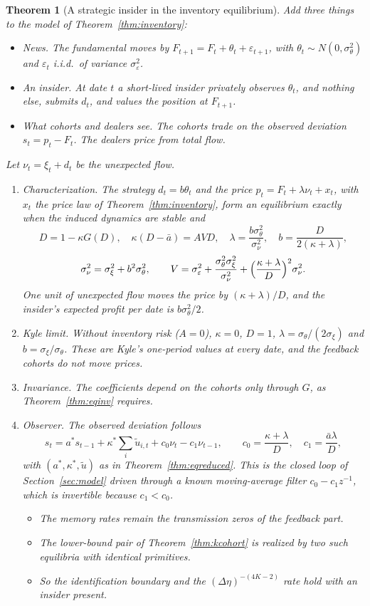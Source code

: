 \documentclass[12pt]{article}
\newtheorem{theorem}{Theorem}[section]
\theoremstyle{definition}
\theoremstyle{remark}
\begin{document}
\begin{theorem}[A strategic insider in the inventory equilibrium]\label{thm:insider}
Add three things to the model of Theorem~\ref{thm:inventory}:
\begin{itemize}[itemsep=1pt,topsep=2pt]
\item \emph{News.} The fundamental moves by $F_{t+1}=F_t+\theta_t+\varepsilon_{t+1}$, with $\theta_t\sim N(0,\sigma_\theta^2)$ and $\varepsilon_t$ i.i.d.\ of variance $\sigma_\varepsilon^2$.
\item \emph{An insider.} At date $t$ a short-lived insider privately observes $\theta_t$, and nothing else, submits $d_t$, and values the position at $F_{t+1}$.
\item \emph{What cohorts and dealers see.} The cohorts trade on the observed deviation $s_t=p_t-F_t$. The dealers price from total flow.
\end{itemize}
Let $\nu_t=\xi_t+d_t$ be the unexpected flow.
\begin{enumerate}[label=(\roman*),itemsep=1pt]
\item \emph{Characterization.} The strategy $d_t=b\theta_t$ and the price $p_t=F_t+\lambda\nu_t+x_t$, with $x_t$ the price law of Theorem~\ref{thm:inventory}, form an equilibrium exactly when the induced dynamics are stable and
\[
 D=1-\kappa G(D),\quad \kappa(D-\bar a)=AVD,\quad \lambda=\frac{b\sigma_\theta^2}{\sigma_\nu^2},\quad b=\frac{D}{2(\kappa+\lambda)},
\]
\[
 \sigma_\nu^2=\sigma_\xi^2+b^2\sigma_\theta^2,\qquad V=\sigma_\varepsilon^2+\frac{\sigma_\theta^2\sigma_\xi^2}{\sigma_\nu^2}+\Bigl(\frac{\kappa+\lambda}{D}\Bigr)^2\sigma_\nu^2 .
\]
One unit of unexpected flow moves the price by $(\kappa+\lambda)/D$, and the insider's expected profit per date is $b\sigma_\theta^2/2$.
\item \emph{Kyle limit.} Without inventory risk ($A=0$), $\kappa=0$, $D=1$, $\lambda=\sigma_\theta/(2\sigma_\xi)$ and $b=\sigma_\xi/\sigma_\theta$. These are Kyle's one-period values at every date, and the feedback cohorts do not move prices.
\item \emph{Invariance.} The coefficients depend on the cohorts only through $G$, as Theorem~\ref{thm:eqinv} requires.
\item \emph{Observer.} The observed deviation follows
\[
 s_t=a^*s_{t-1}+\kappa^*\sum_i\tilde u_{i,t}+c_0\nu_t-c_1\nu_{t-1},\qquad c_0=\frac{\kappa+\lambda}{D},\quad c_1=\frac{\bar a\lambda}{D},
\]
with $(a^*,\kappa^*,\tilde u)$ as in Theorem~\ref{thm:eqreduced}. This is the closed loop of Section~\ref{sec:model} driven through a known moving-average filter $c_0-c_1z^{-1}$, which is invertible because $c_1<c_0$.
\begin{itemize}[itemsep=1pt,topsep=2pt]
\item The memory rates remain the transmission zeros of the feedback part.
\item The lower-bound pair of Theorem~\ref{thm:kcohort} is realized by two such equilibria with identical primitives.
\item So the identification boundary and the $(\Delta\eta)^{-(4K-2)}$ rate hold with an insider present.
\end{itemize}
\end{enumerate}
\end{theorem}
\end{document}
